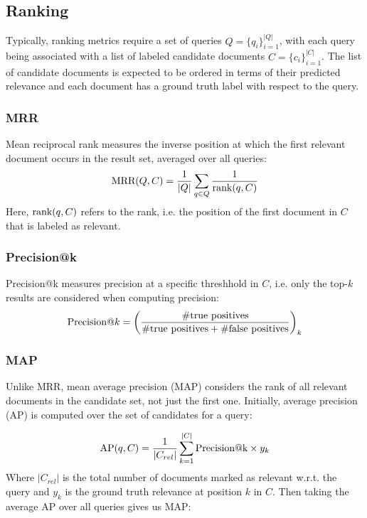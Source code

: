 \subsection{Ranking}
Typically, ranking metrics require a set of queries $Q=\{q_i\}_{i=1}^{|Q|}$, with each query being associated with a list of labeled candidate documents $C=\{c_i\}_{i=1}^{|C|}$. The list of candidate documents is expected to be ordered in terms of their predicted relevance and each document has a ground truth label with respect to the query.

\subsubsection{MRR}
Mean reciprocal rank measures the inverse position at which the first relevant document occurs in the result set, averaged over all queries:
\begin{equation}
    \text{MRR}(Q, C) = \frac{1}{|Q|} \sum_{q \in Q} \frac{1}{\text{rank}(q, C)}
\end{equation}
Here, $\text{rank}(q, C)$ refers to the rank, i.e. the position of the first document in $C$ that is labeled as relevant.

\subsubsection{Precision@k}
Precision@k measures precision at a specific threshhold in $C$, i.e. only the top-$k$ results are considered when computing precision:
\begin{equation}
    \text{Precision@}k = \bigg(\frac{\text{\#true positives}}{\text{\#true positives} + \text{\#false positives}}\bigg)_k
\end{equation}

\subsubsection{MAP}
Unlike MRR, mean average precision (MAP) considers the rank of all relevant documents in the candidate set, not just the first one. Initially, average precision (AP) is computed over the set of candidates for a query:

\begin{equation}
    \text{AP}(q, C) = \frac{1}{|C_{rel}|} \sum_{k=1}^{|C|} \text{Precision@k} \times y_k
\end{equation}
Where $|C_{rel}|$ is the total number of documents marked as relevant w.r.t. the query and $y_k$ is the ground truth relevance at position $k$ in $C$. Then taking the average AP over all queries gives us MAP:

